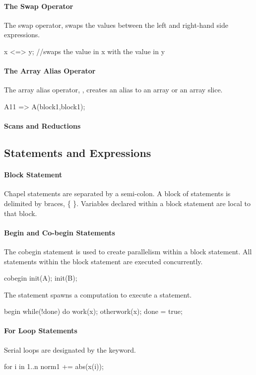 \paragraph{The Swap Operator}
The swap operator, \chpl{<=>} swaps the values between
the left and right-hand side expressions.
\begin{chapel}
x <=> y; //swaps the value in x with the value in y
\end{chapel}

\paragraph{The Array Alias Operator}
The array alias operator, \chpl{=>}, creates an alias
to an array or an array slice.
\begin{chapel}
A11 => A(block1,block1);
\end{chapel}

\paragraph{Scans and Reductions}

\subsection{Statements and Expressions}
\paragraph{Block Statement}
Chapel statements are separated by a semi-colon.  A block
of statements is delimited by braces, \{ \}.  Variables
declared within a block statement are local to that block.

\paragraph{Begin and Co-begin Statements}
The cobegin statement is used to create parallelism within
a block statement.  All statements within the block statement
are executed concurrently.
\begin{chapel}
cobegin {
  init(A);
  init(B);
}
\end{chapel}
The  statement spawns a computation to execute a
statement.
\begin{chapel}
begin {
  while(!done) do work(x);
}
otherwork(x);
done = true;
\end{chapel}
\paragraph{For Loop Statements}
Serial loops are designated by the  keyword.
\begin{chapel}
for i in 1..n {
  norm1 += abs(x(i));
}
\end{chapel}

